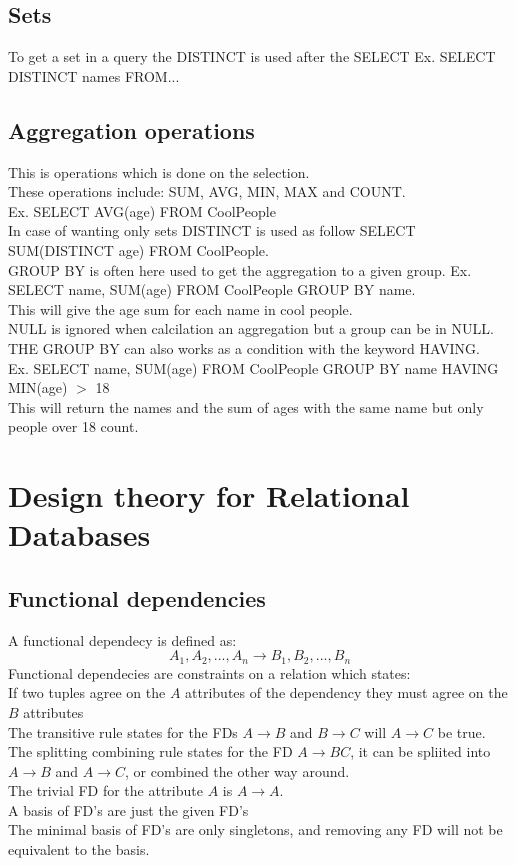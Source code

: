 \documentclass[12pt, a4paper]{article}
\begin{document}
		\subsection{Sets}
			To get a set in a query the DISTINCT is used after the SELECT Ex. SELECT DISTINCT names FROM...\\
		\subsection{Aggregation operations}
			This is operations which is done on the selection.\\
			These operations include: SUM, AVG, MIN, MAX and COUNT.\\
			Ex. SELECT AVG(age) FROM CoolPeople\\
			In case of wanting only sets DISTINCT is used as follow SELECT SUM(DISTINCT age) FROM CoolPeople.\\
			GROUP BY is often here used to get the aggregation to a given group.
			Ex. SELECT name, SUM(age) FROM CoolPeople GROUP BY name.\\
			This will give the age sum for each name in cool people.\\
			NULL is ignored when calcilation an aggregation but a group can be in NULL.\\
			THE GROUP BY can also works as a condition with the keyword HAVING.\\
			Ex. SELECT name, SUM(age) FROM CoolPeople GROUP BY name HAVING MIN(age) $>$ 18\\
			This will return the names and the sum of ages with the same name but only people over 18 count.
			
		
	\section{Design theory for Relational Databases}
		\subsection{Functional dependencies}
			A functional dependecy is defined as:
			$$A_1,A_2,...,A_n \rightarrow B_1,B_2,...,B_n$$
			Functional dependecies are constraints on a relation which states: \\
			If two tuples agree on the $A$ attributes of the dependency they must agree on the $B$ attributes\\
			The transitive rule states for the FDs $A\rightarrow B$ and $B\rightarrow C$ will $A\rightarrow C$ be true.\\
			The splitting combining rule states for the FD $A\rightarrow BC$, it can be spliited into $A\rightarrow B$ and $A\rightarrow C$, or combined the other way around.\\
			The trivial FD for the attribute $A$ is $A\rightarrow A$.\\
			A basis of FD's are just the given FD's\\
			The minimal basis of FD's are only singletons, and removing any FD will not be equivalent to the basis.\\ 
\end{document}
